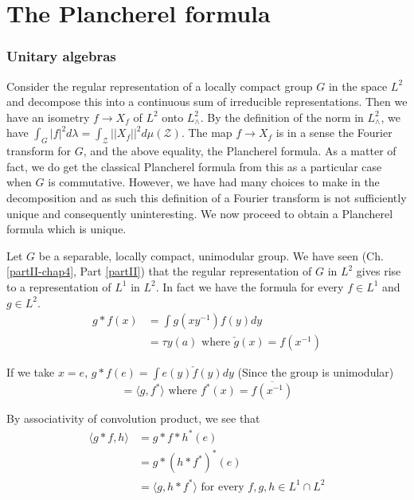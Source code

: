 
\chapter{The Plancherel formula}\label{PartIII-chap3}

\setcounter{section}{3}
\setcounter{subsection}{0}
\subsection{Unitary
  algebras}\label{partIII-chap3-sec3.1}\pageoriginale%

Consider the regular representation of a locally compact group $G$ in
the space  $L^2$ and decompose this into a continuous sum of
irreducible representations. Then we have an isometry $f\rightarrow
X_f$ of $L^2$ onto $L^2_\wedge$.  By the definition of the norm in
$L^2_\wedge$, we have $\int_G
|f|^2 d\lambda=\int_{\mathcal{Z}}||X_f||^2 d\mu (\mathcal{Z})$. The
map $f\rightarrow X_f$ is in a sense the Fourier transform for $G$,
and the above equality, the Plancherel formula. As a matter of fact, we
do get the classical Plancherel formula from this as a particular
case when $G$ is commutative. However, we have had many choices to
make in the  decomposition and as such this definition of a Fourier
transform is not sufficiently unique and consequently uninteresting. We now proceed
to obtain a Plancherel formula which is unique.   

Let $G$ be a separable, locally compact, unimodular group. We have seen
(Ch. \ref{partII-chap4}, Part \ref{partII}) 
that the regular representation of $G$ in $L^2$
gives rise to a representation of $L^1$ in $L^2$. In fact we have the
formula for every $f \in L^1$ and   $ g \in L^2 $.  
\begin{align*}
g*f(x) &= \int g(xy^{-1})f(y)dy\\
&= \tau y(a) \text{ where }  \check{g}(x)=f(x^{-1}) 
\end{align*}

If we take $x= e$, $g*f(e) = \int e(y)\check{f}(y) dy$ (Since the
group is unimodular) 
$$
= \langle g,f^* \rangle \text{ where  } f^* (x)= \overline{f(x^{-1})}
$$

By associativity of convolution product, we see that 
\begin{align*} 
\langle g*f, h \rangle &= g*f*h^*(e)\\
&= g*(h*f^*)^*(e)\\
&= \langle g, h*f^* \rangle \text{ for every } f,g,h \in L^1 \cap L^2
\end{align*}\pageoriginale

